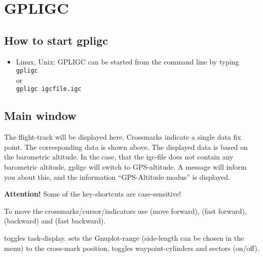 

\section{GPLIGC}

\subsection{How to start gpligc}

\begin{itemize}
\item{Linux, Unix:}
GPLIGC can be started from the command line by typing \\
\texttt{gpligc}\\
or\\
\texttt{gpligc  igcfile.igc}


\end{itemize}

\subsection{Main window}
The flight-track will be displayed here.
Crossmarks indicate a single data fix point.
The corresponding data is shown above.
The displayed data is based on the barometric altitude.
In the case, that the igc-file does not contain any barometric altitude,
gpligc will switch to GPS-altitude.
A message will inform you about this, and
the information ``GPS-Altitude modus'' is displayed.

\textbf{Attention!} Some of the key-shortcuts are case-sensitive!

To move the crossmarks/cursor/indicators use  (move forward),  (fast forward),  (backward) and  (fast backward).

 toggles task-display.
 sets the Gnuplot-range (side-length can be chosen in the menu) to the cross-mark position,
 toggles waypoint-cylinders and sectors (on/off).

